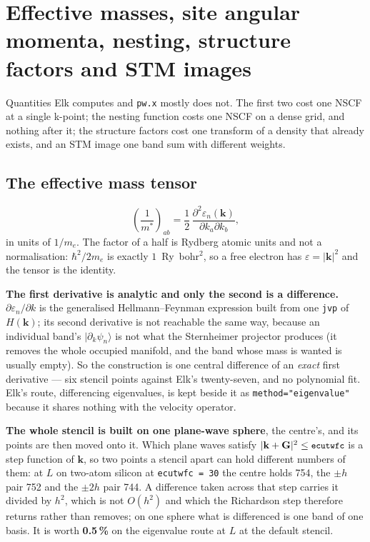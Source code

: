 \documentclass[11pt,a4paper]{article}
\newcommand{\code}[1]{\texttt{\small #1}}
\begin{document}
\section{Effective masses, site angular momenta, nesting, structure factors and
STM images}

Quantities Elk computes and \code{pw.x} mostly does not. The first two cost one
NSCF at a single k-point; the nesting function costs one NSCF on a dense grid,
and nothing after it; the structure factors cost one transform of a density that
already exists, and an STM image one band sum with different weights.

\subsection{The effective mass tensor}

\begin{equation*}
  \left(\frac{1}{m^*}\right)_{ab}
  = \frac{1}{2}\,\frac{\partial^2 \varepsilon_n(\mathbf k)}
                      {\partial k_a \partial k_b},
\end{equation*}
in units of $1/m_e$. The factor of a half is Rydberg atomic units and not a
normalisation: $\hbar^2/2m_e$ is exactly $1$~Ry~bohr$^2$, so a free electron has
$\varepsilon = |\mathbf k|^2$ and the tensor is the identity.

\textbf{The first derivative is analytic and only the second is a difference.}
$\partial \varepsilon_n/\partial k$ is the generalised Hellmann--Feynman
expression built from one \code{jvp} of $H(\mathbf k)$; its second derivative is
not reachable the same way, because an individual band's $|\partial_k \psi_n
\rangle$ is not what the Sternheimer projector produces (it removes the whole
occupied manifold, and the band whose mass is wanted is usually empty). So the
construction is one central difference of an \emph{exact} first derivative ---
six stencil points against Elk's twenty-seven, and no polynomial fit. Elk's
route, differencing eigenvalues, is kept beside it as \code{method="eigenvalue"}
because it shares nothing with the velocity operator.

\textbf{The whole stencil is built on one plane-wave sphere}, the centre's, and
its points are then moved onto it. Which plane waves satisfy
$|\mathbf k + \mathbf G|^2 \le \code{ecutwfc}$ is a step function of
$\mathbf k$, so two points a stencil apart can hold different numbers of them:
at $L$ on two-atom silicon at \code{ecutwfc = 30} the centre holds 754, the
$\pm h$ pair 752 and the $\pm 2h$ pair 744. A difference taken across that step
carries it divided by $h^2$, which is not $O(h^2)$ and which the Richardson step
therefore returns rather than removes; on one sphere what is differenced is one
band of one basis. It is worth \textbf{0.5\,\%} on the eigenvalue route at $L$
at the default stencil.
\end{document}
